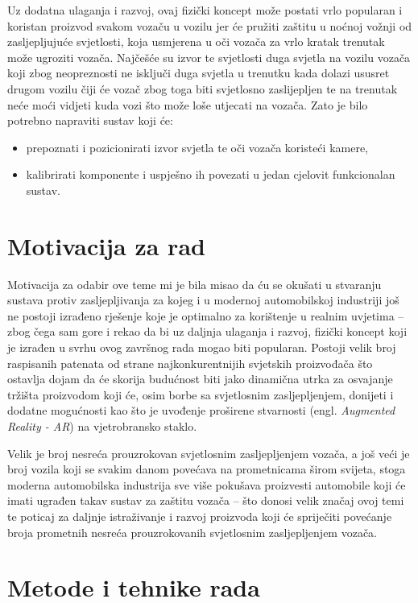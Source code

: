 \documentclass{foi}
\begin{document}
Uz dodatna ulaganja i razvoj, ovaj fizički koncept može postati vrlo popularan i koristan proizvod svakom vozaču u vozilu jer će pružiti zaštitu u noćnoj vožnji od zasljepljujuće svjetlosti, koja usmjerena u oči vozača za vrlo kratak trenutak može ugroziti vozača. Najčešće su izvor te svjetlosti duga svjetla na vozilu vozača koji zbog neopreznosti ne isključi duga svjetla u trenutku kada dolazi ususret drugom vozilu čiji će vozač zbog toga biti svjetlosno zaslijepljen te na trenutak neće moći vidjeti kuda vozi što može loše utjecati na vozača. Zato je bilo potrebno napraviti sustav koji će:
\begin{itemize}[noitemsep]
    \item prepoznati i pozicionirati izvor svjetla te oči vozača koristeći kamere,
    \item kalibrirati komponente i uspješno ih povezati u jedan cjelovit funkcionalan sustav.
\end{itemize}

\pagebreak
\section{Motivacija za rad}

Motivacija za odabir ove teme mi je bila misao da ću se okušati u stvaranju sustava protiv zasljepljivanja za kojeg i u modernoj automobilskoj industriji još ne postoji izrađeno rješenje koje je optimalno za korištenje u realnim uvjetima – zbog čega sam gore i rekao da bi uz daljnja ulaganja i razvoj,  fizički koncept koji je izrađen u svrhu ovog završnog rada mogao biti popularan. Postoji velik broj raspisanih patenata od strane najkonkurentnijih svjetskih proizvođača što ostavlja dojam da će skorija budućnost biti jako dinamična utrka za osvajanje tržišta proizvodom koji će, osim borbe sa svjetlosnim zasljepljenjem, donijeti i dodatne mogućnosti kao što je uvođenje proširene stvarnosti (engl. \emph{Augmented Reality - AR}) na vjetrobransko staklo.

Velik je broj nesreća prouzrokovan svjetlosnim zasljepljenjem vozača, a još veći je broj vozila koji se svakim danom povećava na prometnicama širom svijeta, stoga moderna automobilska industrija sve više pokušava proizvesti automobile koji će imati ugrađen takav sustav za zaštitu vozača – što donosi velik značaj ovoj temi te poticaj za daljnje istraživanje i razvoj proizvoda koji će spriječiti povećanje broja prometnih nesreća prouzrokovanih svjetlosnim zasljepljenjem vozača.

\section{Metode i tehnike rada}
\end{document}
